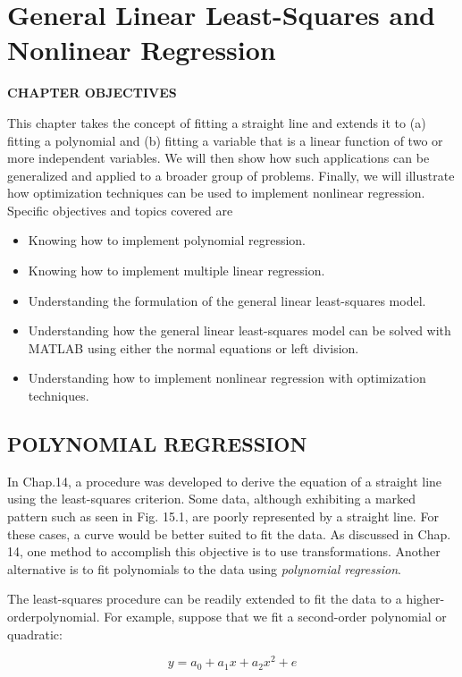 \documentclass[../main.tex]{subfiles}
\begin{document}
\chapter{General Linear Least-Squares and Nonlinear Regression}
\textbf{CHAPTER OBJECTIVES}

\noindent This chapter takes the concept of fitting a straight line and extends it to (a) fitting a polynomial and (b) fitting a variable that is a linear function of two or more independent variables. We will then show how such applications can be generalized and applied to a broader group of problems. Finally, we will illustrate how optimization techniques can be used to implement nonlinear regression. Specific objectives and topics covered are

\begin{itemize}
	\item Knowing how to implement polynomial regression.
	\item Knowing how to implement multiple linear regression. 
	\item Understanding the formulation of the general linear least-squares model.
	\item Understanding how the general linear least-squares model can be solved with MATLAB using either the normal equations or left division.
	\item Understanding how to implement nonlinear regression with optimization techniques.
\end{itemize}


\label{cha:cha_P_15_1}
\section{POLYNOMIAL REGRESSION}
\noindent In Chap.14, a procedure was developed to derive the equation of a straight line using the least-squares criterion. Some data, although exhibiting a marked pattern such as seen in Fig. 15.1, are poorly represented by a straight line. For these cases, a curve would be better suited to fit the data. As discussed in Chap. 14, one method to accomplish this objective is to use transformations. Another alternative is to fit polynomials to the data using \emph{polynomial regression}.

The least-squares procedure can be readily extended to fit the data to a higher-orderpolynomial. For example,  suppose that we fit a second-order polynomial or quadratic:

\begin{equation}
	\tag{15.1}
	y = a_0 + a_1x + a_2x^2 + e
\end{equation}
\end{document}
